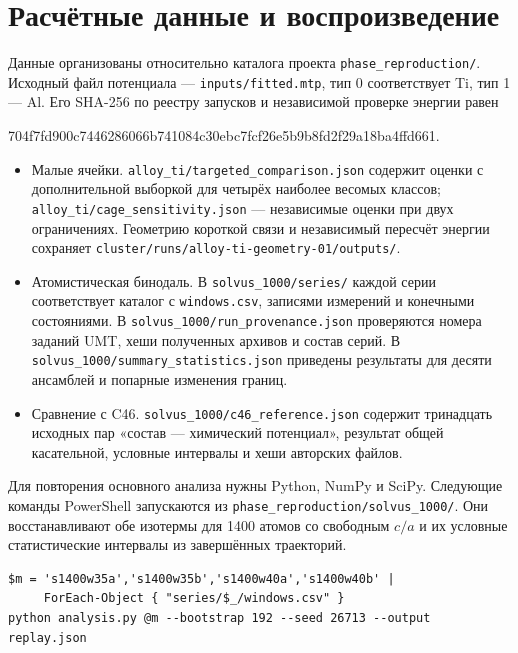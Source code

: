 \documentclass[11pt,a4paper]{article}
\begin{document}
\section*{Расчётные данные и воспроизведение}
\label{sec:archive}
Данные организованы относительно каталога проекта
\nolinkurl{phase_reproduction/}. Исходный файл потенциала —
\nolinkurl{inputs/fitted.mtp}, тип 0 соответствует Ti, тип 1 — Al.
Его SHA-256 по реестру запусков и независимой проверке энергии равен
\begin{center}
{\small\ttfamily 704f7fd900c7446286066b741084c30ebc7fcf26e5b9b8fd2f29a18ba4ffd661}.
\end{center}
\begin{itemize}
\item Малые ячейки. \nolinkurl{alloy_ti/targeted_comparison.json} содержит
оценки с дополнительной выборкой для четырёх наиболее весомых классов;
\nolinkurl{alloy_ti/cage_sensitivity.json} — независимые оценки при двух
ограничениях. Геометрию короткой связи и независимый пересчёт энергии
сохраняет \nolinkurl{cluster/runs/alloy-ti-geometry-01/outputs/}.
\item Атомистическая бинодаль. В \nolinkurl{solvus_1000/series/} каждой
серии соответствует каталог с \texttt{windows.csv}, записями измерений и
конечными состояниями. В \nolinkurl{solvus_1000/run_provenance.json}
проверяются номера заданий UMT, хеши полученных архивов и состав серий.
В \nolinkurl{solvus_1000/summary_statistics.json} приведены результаты
для десяти ансамблей и попарные изменения границ.
\item Сравнение с C46. \nolinkurl{solvus_1000/c46_reference.json}
содержит тринадцать исходных пар «состав — химический потенциал»,
результат общей касательной, условные интервалы и хеши авторских файлов.
\end{itemize}

Для повторения основного анализа нужны Python, NumPy и SciPy. Следующие
команды PowerShell запускаются из \nolinkurl{phase_reproduction/solvus_1000/}.
Они восстанавливают обе изотермы для 1400 атомов со свободным \(c/a\) и
их условные статистические интервалы из завершённых траекторий.
{\small
\begin{verbatim}
$m = 's1400w35a','s1400w35b','s1400w40a','s1400w40b' |
     ForEach-Object { "series/$_/windows.csv" }
python analysis.py @m --bootstrap 192 --seed 26713 --output replay.json
\end{verbatim}
}
\end{document}
